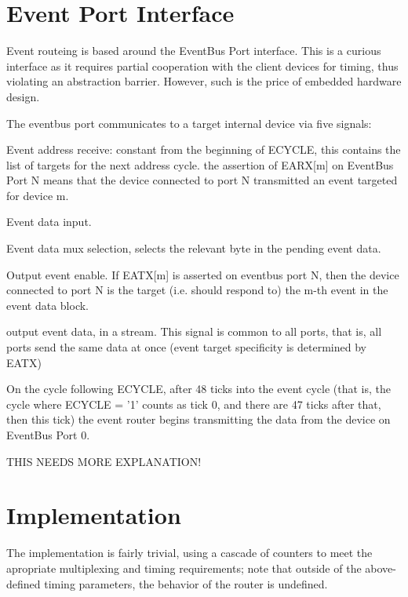 
\section{Event Port Interface}

Event routeing is based around the EventBus Port interface. This is a
curious interface as it requires partial cooperation with the client
devices for timing, thus violating an abstraction barrier. However,
such is the price of embedded hardware design.


The eventbus port communicates to a target internal device via five signals:

 Event address receive: constant from the
beginning of ECYCLE, this contains the list of targets for the next
address cycle. the assertion of EARX[m] on EventBus Port N means that
the device connected to port N transmitted an event targeted for
device m.

 Event data input. 

 Event data mux selection, selects the relevant
byte in the pending event data.

 Output event enable. If EATX[m] is asserted on
eventbus port N, then the device connected to port N is the target
(i.e. should respond to) the m-th event in the event data block.

 output event data, in a stream. This signal is common to all ports, that is, all ports send the same data at once (event target specificity is determined by EATX)

On the cycle following ECYCLE, after 48 ticks into the event cycle
(that is, the cycle where ECYCLE = '1' counts as tick 0, and there are
47 ticks after that, then this tick) the event router begins
transmitting the data from the device on EventBus Port 0.

THIS NEEDS MORE EXPLANATION! 

\section{Implementation}

The implementation is fairly trivial, using a cascade of counters to
meet the apropriate multiplexing and timing requirements; note that
outside of the above-defined timing parameters, the behavior of the
router is undefined.

